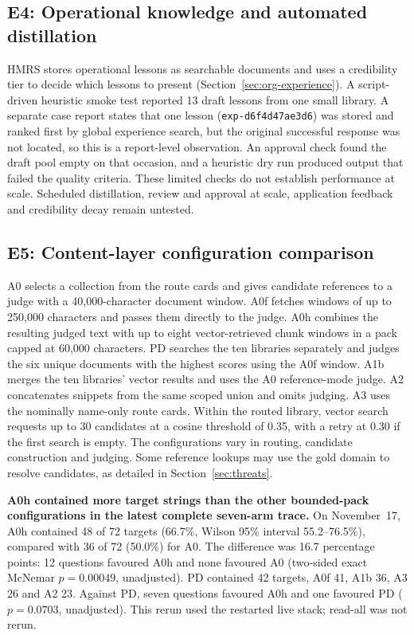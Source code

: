 \subsection{E4: Operational knowledge and automated distillation}
\label{sec:e3}
HMRS stores operational lessons as searchable documents and uses a
credibility tier to decide which lessons to present
(Section~\ref{sec:org-experience}). A script-driven heuristic smoke test
reported 13 draft lessons from one small library. A separate case report
states that one lesson (\texttt{exp-d6f4d47ae3d6}) was stored and ranked
first by global experience search, but the original successful response
was not located, so this is a report-level observation. An approval check
found the draft pool empty on that occasion, and a heuristic dry run
produced output that failed the quality criteria. These limited checks do
not establish performance at scale. Scheduled distillation, review and
approval at scale, application feedback and credibility decay remain
untested.

\subsection{E5: Content-layer configuration comparison}
\label{sec:ladder-opt}
A0 selects a collection from the route cards and gives candidate references
to a judge with a 40{,}000-character document window. A0f fetches windows of
up to 250{,}000 characters and passes them directly to the judge. A0h
combines the resulting judged text with up to eight vector-retrieved chunk
windows in a pack capped at 60{,}000 characters. PD searches the ten libraries
separately and judges the six unique documents with the highest scores using
the A0f window. A1b merges the ten libraries' vector results and uses the A0
reference-mode judge. A2 concatenates snippets from the same scoped union
and omits judging. A3 uses the nominally name-only route cards. Within the
routed library, vector search requests up to 30 candidates at a cosine
threshold of 0.35, with a retry at 0.30 if the first search is empty.
The configurations vary in routing, candidate construction and judging.
Some reference lookups may use the gold domain to resolve candidates,
as detailed in Section~\ref{sec:threats}.

\textbf{A0h contained more target strings than the other bounded-pack
configurations in the latest complete seven-arm trace.} On November~17,
A0h contained 48 of 72 targets (66.7\%, Wilson 95\% interval
55.2--76.5\%), compared with 36 of 72 (50.0\%) for A0. The difference
was 16.7 percentage points: 12 questions favoured A0h and none favoured
A0 (two-sided exact McNemar $p=0.00049$, unadjusted). PD contained 42
targets, A0f 41, A1b 36, A3 26 and A2 23. Against PD, seven questions favoured
A0h and one favoured PD ($p=0.0703$, unadjusted). This rerun used the
restarted live stack; read-all was not rerun.


